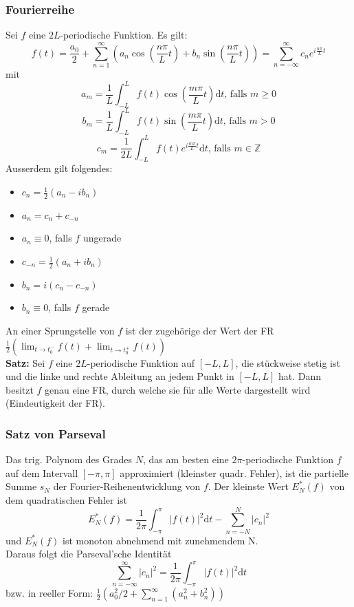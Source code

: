 \documentclass[8pt, a4paper, landscape, fleqn]{scrartcl}
\def\Z{\mathbb{Z}}
\def\d{\text{d}}
\newcommand{\blue}[1]{\textcolor{ethblue}{#1}}
\begin{document}
\begin{multicols*}{3}
		\subsubsection{Fourierreihe}
		Sei $f$ eine $2L$-periodische Funktion. Es gilt: $$ f(t) = \frac{a_0}{2}+\sum_{n=1}^\infty \left(a_n \cos\left(\frac{n\pi}{L}t\right)+b_n \sin\left(\frac{n\pi}{L}t\right)\right) = \sum_{n = -\infty}^\infty c_n e^{i\frac{n\pi}{L}t}$$
		mit $$ a_m = \frac{1}{L}\int_{-L}^L f(t)\cos\left(\frac{m\pi}{L}t\right)\d t \text{, falls } m \geq 0$$
		$$ b_m = \frac{1}{L}\int_{-L}^L f(t)\sin\left(\frac{m\pi}{L}t\right)\d t \text{, falls } m > 0$$
		$$ c_m = \frac{1}{2L}\int_{-L}^L f(t)e^{i\frac{m\pi}{L}t}\d t \text{, falls } m \in\Z$$
		Ausserdem gilt folgendes: 
		\setlength{\columnseprule}{0pt}
		\begin{multicols}{2}
			\begin{itemize}
				\item $c_n = \frac{1}{2}(a_n - i b_n)$
				\item $a_n = c_n + c_{-n}$
				\item $a_n \equiv 0$, falls $f$ ungerade
				\item $c_{-n} = \frac{1}{2}(a_n + i b_n)$
				\item $b_n = i(c_n - c_{-n})$
				\item $b_n \equiv 0$, falls $f$ gerade
			\end{itemize}
		\end{multicols}
		\setlength{\columnseprule}{0.5pt}
		An einer \blue{Sprungstelle} von $f$ ist der zugehörige der Wert der FR $\frac{1}{2}\left(\lim_{t\to t_0^-}f(t) + \lim_{t\to t_0^+} f(t)\right)$ \\
		
		\textbf{Satz: } Sei $f$ eine $2L$-periodische Funktion auf $[-L, L]$, die stückweise stetig ist und die linke und rechte Ableitung an jedem Punkt in $[-L, L]$ hat. Dann besitzt $f$ genau eine FR, durch welche sie für alle Werte dargestellt wird (\blue{Eindeutigkeit der FR}).
		
		\subsubsection{Satz von Parseval}
		Das trig. Polynom des Grades $N$, das am besten eine $2\pi$-periodische Funktion $f$ auf dem Intervall $[-\pi, \pi]$ approximiert (kleinster quadr. Fehler), ist die partielle Summe $s_N$ der Fourier-Reihenentwicklung von $f$. Der kleinste Wert $E^*_N(f)$ von dem quadratischen Fehler ist $$ E^*_N (f) = \frac{1}{2\pi}\int_{-\pi}^{\pi} |f(t)|^2 \d t - \sum_{n=-N}^N |c_n|^2 $$ und $E^*_N (f)$ ist monoton abnehmend mit zunehmendem N. \\
		Daraus folgt die Parseval'sche Identität $$ \sum_{n=-\infty}^\infty |c_n|^2 = \frac{1}{2\pi} \int_{-\pi}^\pi |f(t)|^2 \d t$$ bzw. in reeller Form: $\frac{1}{2}\left(a_0^2/2 + \sum_{n=1}^\infty (a_n^2+b_n^2)\right)$
		

\end{multicols*}
\end{document}
